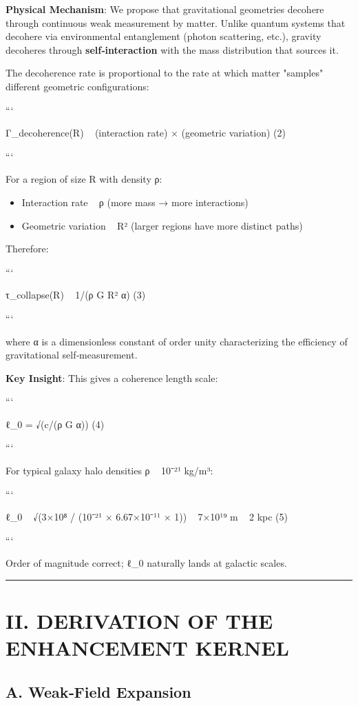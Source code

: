 \documentclass[11pt,a4paper]{article}
\begin{document}
\textbf{Physical Mechanism}: We propose that gravitational geometries decohere through continuous weak measurement by matter. Unlike quantum systems that decohere via environmental entanglement (photon scattering, etc.), gravity decoheres through \textbf{self‑interaction} with the mass distribution that sources it.


The decoherence rate is proportional to the rate at which matter "samples" different geometric configurations:


```

Γ\_decoherence(R) ~ (interaction rate) × (geometric variation)     (2)

```


For a region of size R with density ρ:

\begin{itemize}
\item Interaction rate ~ ρ (more mass → more interactions)
\item Geometric variation ~ R² (larger regions have more distinct paths)
\end{itemize}


Therefore:

```

τ\_collapse(R) ~ 1/(ρ G R² α)     (3)

```


where α is a dimensionless constant of order unity characterizing the efficiency of gravitational self‑measurement.


\textbf{Key Insight}: This gives a coherence length scale:

```

ℓ\_0 = √(c/(ρ G α))     (4)

```


For typical galaxy halo densities ρ ~ 10⁻²¹ kg/m³:

```

ℓ\_0 ~ √(3×10⁸ / (10⁻²¹ × 6.67×10⁻¹¹ × 1)) ~ 7×10¹⁹ m ~ 2 kpc     (5)

```


Order of magnitude correct; ℓ\_0 naturally lands at galactic scales.


\medskip\hrule\medskip


\section{II. DERIVATION OF THE ENHANCEMENT KERNEL}


\subsection{A. Weak‑Field Expansion}
\end{document}
